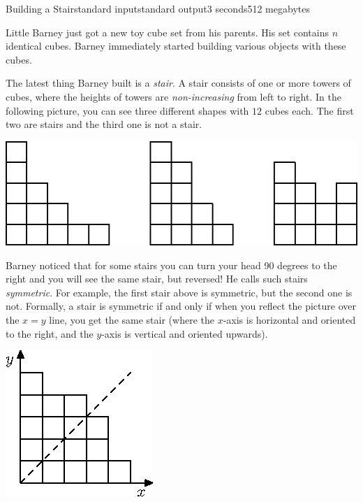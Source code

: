 \begin{problem}{Building a Stair}{standard input}{standard output}{3 seconds}{512 megabytes}

Little Barney just got a new toy cube set from his parents. His set contains $n$ identical cubes. Barney immediately started building various objects with these cubes.

The latest thing Barney built is a \textit{stair}. A stair consists of one or more towers of cubes, where the heights of towers are \textit{non-increasing} from left to right. In the following picture, you can see three different shapes with $12$ cubes each. The first two are stairs and the third one is not a stair.

\vspace*{-5pt}

\begin{center}
\includegraphics{figure-1}
\end{center}

\vspace*{-5pt}

Barney noticed that for some stairs you can turn your head 90 degrees to the right and you will see the same stair, but reversed! He calls such stairs \textit{symmetric}. For example, the first stair above is symmetric, but the second one is not. Formally, a stair is symmetric if and only if when you reflect the picture over the $x = y$ line, you get the same stair (where the $x$-axis is horizontal and oriented to the right, and the $y$-axis is vertical and oriented upwards).

\vspace*{-5pt}

\begin{center}
\includegraphics{figure-2}
\end{center}


\end{problem}
